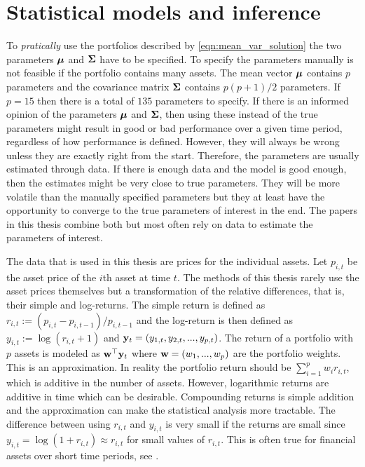 \documentclass[12pt, twoside]{book}\usepackage{knitr}
\begin{document}
\chapter{Statistical models and inference}\label{ch:estim}


To \textit{pratically} use the portfolios described by \eqref{eqn:mean_var_solution} the two parameters $\mbox{\boldmath$\mu$}$ and $\mathbf{\Sigma}$ have to be specified. 
To specify the parameters manually is not feasible if the portfolio contains many assets.
The mean vector $\mbox{\boldmath$\mu$}$ contains $p$ parameters and the covariance matrix $\mathbf{\Sigma}$ contains $p(p+1)/2$ parameters.
If $p=15$ then there is a total of $135$ parameters to specify. 
If there is an informed opinion of the parameters $\mbox{\boldmath$\mu$}$ and $\mathbf{\Sigma}$, then using these instead of the true parameters might result in good or bad performance over a given time period, regardless of how performance is defined.
However, they will always be wrong unless they are exactly right from the start.
Therefore, the parameters are usually estimated through data.
If there is enough data and the model is good enough, then the estimates might be very close to true parameters.
They will be more volatile than the manually specified parameters but they at least have the opportunity to converge to the true parameters of interest in the end.
The papers in this thesis combine both but most often rely on data to estimate the parameters of interest.

The data that is used in this thesis are prices for the individual assets.
Let $p_{i,t}$ be the asset price of the $i$th asset at time $t$. 
The methods of this thesis rarely use the asset prices themselves but a transformation of the relative differences, that is, their simple and log-returns. 
The simple return is defined as $r_{i,t} := (p_{i,t}-p_{i,t-1})/p_{i,t-1}$ and the log-return is then defined as $y_{i,t} := \log(r_{i,t} + 1)$ and $\mathbf{y}_t=(y_{1,t},y_{2,t},..., y_{p,t})$.
The return of a portfolio with $p$ assets is modeled as $\mathbf{w}^\top \mathbf{y}_t$ where $\mathbf{w}=(w_1, ..., w_p)$ are the portfolio weights.
This is an approximation.
In reality the portfolio return should be $\sum_{i=1}^p w_i r_{i,t}$, which is additive in the number of assets.
However, logarithmic returns are additive in time which can be desirable. 
Compounding returns is simple addition and the approximation can make the statistical analysis more tractable. 
The difference between using $r_{i,t}$ and $y_{i,t}$ is very small if the returns are small since $y_{i,t}=\log(1+r_{i,t}) \approx r_{i,t}$ for small values of $r_{i,t}$.
This is often true for financial assets over short time periods, see \citet[p. 5]{tsay2005analysis}. 
\end{document}
